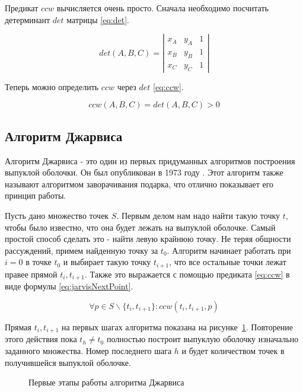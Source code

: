 Предикат $ccw$ вычисляется очень просто. Сначала необходимо посчитать детерминант $det$ матрицы \eqref{eq:det}.

\begin{equation}\label{eq:det}
det(A, B, C)= \left| \begin{array}{ccc} x_A & y_A & 1 \\ x_B & y_B & 1 \\ x_C & y_C & 1  \end{array}\right|
\end{equation}

Теперь можно определить $ccw$ через $det$ \eqref{eq:ccw}.

\begin{equation}\label{eq:ccw}
ccw(A, B, C)=det(A, B, C) > 0
\end{equation}


\subsection{Алгоритм Джарвиса} \label{subsect1_1_1}

Алгоритм Джарвиса - это один из первых придуманных алгоритмов построения выпуклой оболочки. Он был опубликован в 1973 году \cite{jarvis1973Jarvis}. Этот алгоритм также называют алгоритмом заворачивания подарка, что отлично показывает его принцип работы.

Пусть дано множество точек $S$. Первым делом нам надо найти такую точку $t$, чтобы было известно, что она будет лежать на выпуклой оболочке. Самый простой способ сделать это - найти левую крайнюю точку. Не теряя общности рассуждений, примем найденную точку за $t_0$. Алгоритм начинает работать при $i=0$ в точке $t_0$ и выбирает такую точку $t_{i+1}$, что все остальные точки лежат правее прямой $t_i, t_{i+1}$. Также это выражается с помощью предиката \eqref{eq:ccw} в виде формулы \eqref{eq:jarvisNextPoint}.

\begin{equation}\label{eq:jarvisNextPoint}
\forall p \in S \backslash \{t_i, t_{i+1}\} : ccw(t_i, t_{i+1}, p)
\end{equation}

Прямая $t_i, t_{i+1}$ на первых шагах алгоритма показана на рисунке~\ref{img:jarvis}. Повторение этого действия пока $t_h \neq t_0$ полностью построит выпуклую оболочку изначально заданного множества. Номер последнего шага $h$ и будет количеством точек в получившейся выпуклой оболочке.

\begin{figure}[H]
    {\centering
        \hfill
        \subbottom[\label{img:jarvis_1}]{%
            }
        \hfill
        \subbottom[\label{img:jarvis_2}]{%
            }
        \hfill
    }
    \caption{Первые этапы работы алгоритма Джарвиса}
    \label{img:jarvis}
\end{figure}

